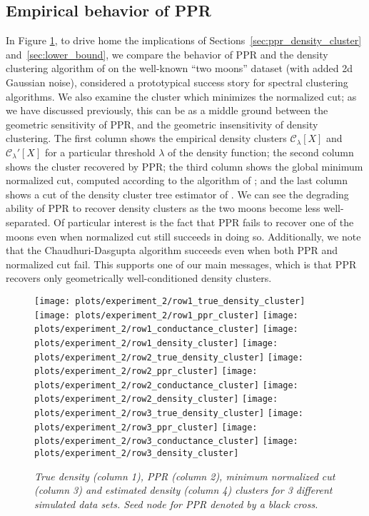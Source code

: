 \documentclass[11pt,twoside]{article}
\theoremstyle{definition}
\newcommand{\1}{\mathbf{1}}
\newcommand{\mc}[1]{\mathcal{#1}}
\begin{document}
\subsection{Empirical behavior of PPR} 
\label{subsec:empirical_behavior_ppr}
In Figure \ref{fig:moons}, to drive home 
the implications of Sections~\ref{sec:ppr_density_cluster} and~\ref{sec:lower_bound}, we compare the behavior of PPR
and the density clustering algorithm of \citet{chaudhuri2010} on
the well-known ``two moons'' dataset (with added 2d Gaussian noise), considered
a prototypical success story for spectral clustering algorithms. We also examine the cluster which minimizes the normalized cut; as we have discussed previously, this can be as a middle ground between the geometric sensitivity of PPR, and the geometric insensitivity of density clustering. The first
column shows the empirical density clusters $\mc{C}_{\lambda}[X]$ and $\mc{C}_{\lambda}'[X]$ for
a particular threshold $\lambda$ of the density function; the second column
shows the cluster recovered by PPR; the third column shows the global minimum
normalized cut, computed according to the algorithm of \citet{bresson2013}; and
the last column shows a cut of the density cluster tree estimator of
\citet{chaudhuri2010}.  We can see the degrading ability of PPR to recover
density clusters as the two moons become less well-separated. Of particular
interest is the fact that PPR fails to recover one of the moons even when
normalized cut still succeeds in doing so. Additionally, we note that the
Chaudhuri-Dasgupta algorithm succeeds even when both PPR and normalized cut
fail.  This supports one of our main messages, which is that PPR recovers only
geometrically well-conditioned density clusters.

\begin{figure}
	\centering
	\texttt{[image: plots/experiment\_2/row1\_true\_density\_cluster]}
	\texttt{[image: plots/experiment\_2/row1\_ppr\_cluster]}
	\texttt{[image: plots/experiment\_2/row1\_conductance\_cluster]}
	\texttt{[image: plots/experiment\_2/row1\_density\_cluster]}
	\texttt{[image: plots/experiment\_2/row2\_true\_density\_cluster]}
	\texttt{[image: plots/experiment\_2/row2\_ppr\_cluster]}
	\texttt{[image: plots/experiment\_2/row2\_conductance\_cluster]}
	\texttt{[image: plots/experiment\_2/row2\_density\_cluster]}
	\texttt{[image: plots/experiment\_2/row3\_true\_density\_cluster]}
	\texttt{[image: plots/experiment\_2/row3\_ppr\_cluster]}
	\texttt{[image: plots/experiment\_2/row3\_conductance\_cluster]}
	\texttt{[image: plots/experiment\_2/row3\_density\_cluster]}
	\caption{\it\small True density (column 1), PPR (column 2), minimum normalized
		cut (column 3) and estimated density (column 4) clusters for 3 different 
		simulated data sets. Seed node for PPR denoted by a black cross.} 
	\label{fig:moons}
\end{figure}
\end{document}
